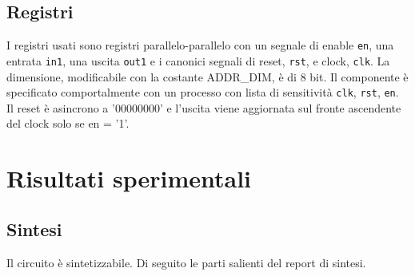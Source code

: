 \documentclass [a4paper, 12pt]{article}
\begin{document}
\subsection{Registri}
I registri usati sono registri parallelo-parallelo con un segnale di enable \texttt{en}, una entrata \texttt{in1}, una uscita \texttt{out1} e i canonici segnali di reset, \texttt{rst}, e clock, \texttt{clk}. La dimensione, modificabile con la costante ADDR\_DIM, \`e di 8 bit. Il componente \`e specificato comportalmente con un processo con lista di sensitivit\`a \texttt{clk}, \texttt{rst}, \texttt{en}. Il reset \`e asincrono a '00000000' e l'uscita viene aggiornata sul fronte ascendente del clock solo se en = '1'.

\newpage

\section{Risultati sperimentali}

\subsection{Sintesi}
Il circuito \`e sintetizzabile. Di seguito le parti salienti del report di sintesi.

\end{document}
